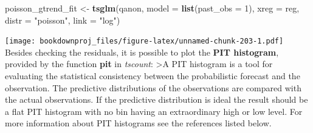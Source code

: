 \documentclass[
]{article}
\newenvironment{Shaded}{\begin{snugshade}}{\end{snugshade}}
\newcommand{\DataTypeTok}[1]{\textcolor[rgb]{0.13,0.29,0.53}{#1}}
\newcommand{\DecValTok}[1]{\textcolor[rgb]{0.00,0.00,0.81}{#1}}
\newcommand{\KeywordTok}[1]{\textcolor[rgb]{0.13,0.29,0.53}{\textbf{#1}}}
\newcommand{\NormalTok}[1]{#1}
\newcommand{\OperatorTok}[1]{\textcolor[rgb]{0.81,0.36,0.00}{\textbf{#1}}}
\newcommand{\StringTok}[1]{\textcolor[rgb]{0.31,0.60,0.02}{#1}}
\begin{document}
\begin{Shaded}
\begin{Highlighting}[]
\NormalTok{poisson_gtrend_fit <-}\StringTok{ }\KeywordTok{tsglm}\NormalTok{(qanon,}
                            \DataTypeTok{model =} \KeywordTok{list}\NormalTok{(}\DataTypeTok{past_obs =} \DecValTok{1}\NormalTok{), }
                            \DataTypeTok{xreg =}\NormalTok{ reg,}
                            \DataTypeTok{distr =} \StringTok{"poisson"}\NormalTok{, }\DataTypeTok{link =} \StringTok{"log"}\NormalTok{)}
\end{Highlighting}
\end{Shaded}

\begin{Shaded}
\end{Shaded}

\texttt{[image: bookdownproj\_files/figure-latex/unnamed-chunk-203-1.pdf]}
Besides checking the residuals, it is possible to plot the \textbf{PIT histogram}, provided by the function \textbf{pit} in \emph{tscount}:
\textgreater A PIT histogram is a tool for evaluating the statistical consistency between the probabilistic forecast and the observation. The predictive distributions of the observations are compared with the actual observations. If the predictive distribution is ideal the result should be a flat PIT histogram with no bin having an extraordinary high or low level. For more information about PIT histograms see the references listed below.
\end{document}

